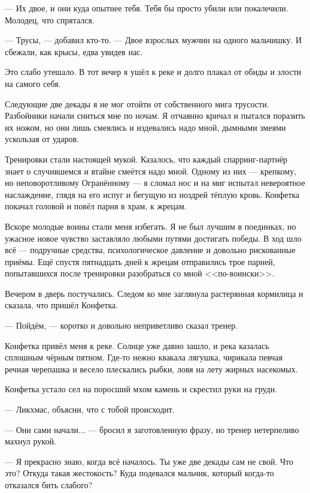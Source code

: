 --- Их двое, и они куда опытнее тебя.
Тебя бы просто убили или покалечили.
Молодец, что спрятался.

--- Трусы, --- добавил кто-то.
--- Двое взрослых мужчин на одного мальчишку.
И сбежали, как крысы, едва увидев нас.

Это слабо утешало.
В тот вечер я ушёл к реке и долго плакал от обиды и злости на самого себя.

\asterism

Следующие две декады я не мог отойти от собственного мига трусости.
Разбойники начали сниться мне по ночам.
Я отчаянно кричал и пытался поразить их ножом, но они лишь смеялись и издевались надо мной, дымными змеями ускользая от ударов.

Тренировки стали настоящей мукой.
Казалось, что каждый спарринг-партнёр знает о случившемся и втайне смеётся надо мной.
Одному из них --- крепкому, но неповоротливому Огранённому --- я сломал нос и на миг испытал невероятное наслаждение, глядя на его испуг и бегущую из ноздрей тёплую кровь.
Конфетка покачал головой и повёл парня в храм, к жрецам.

Вскоре молодые воины стали меня избегать.
Я не был лучшим в поединках, но ужасное новое чувство заставляло любыми путями достигать победы.
В ход шло всё --- подручные средства, психологическое давление и довольно рискованные приёмы.
Ещё спустя пятнадцать дней к жрецам отправились трое парней, попытавшихся после тренировки разобраться со мной <<по-воински>>.

Вечером в дверь постучались.
Следом ко мне заглянула растерянная кормилица и сказала, что пришёл Конфетка.

--- Пойдём, --- коротко и довольно неприветливо сказал тренер.

Конфетка привёл меня к реке.
Солнце уже давно зашло, и река казалась сплошным чёрным пятном.
Где-то нежно квакала лягушка, чирикала певчая речная черепашка и весело плескались рыбки, ловя на лету жирных насекомых.

Конфетка устало сел на поросший мхом камень и скрестил руки на груди.

--- Ликхмас, объясни, что с тобой происходит.

--- Они сами начали... --- бросил я заготовленную фразу, но тренер нетерпеливо махнул рукой.

--- Я прекрасно знаю, когда всё началось.
Ты уже две декады сам не свой.
Что это?
Откуда такая жестокость?
Куда подевался мальчик, который когда-то отказался бить слабого?

